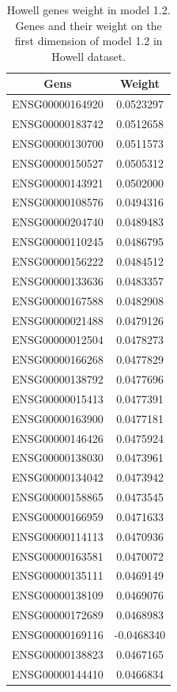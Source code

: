\documentclass[
  12pt,
  a4paper,
  twoside,
  openright]{book}
\begin{document}
\begin{longtable}[t]{cc}
\caption[Howell genes weight in model 1.2]{\label{tab:howell-genes-1-2}Howell genes weight in model 1.2. Genes and their weight on the first dimension of model 1.2 in Howell dataset.}\\
\toprule
Gens & Weight\\
\midrule
ENSG00000164920 & 0.0523297\\
ENSG00000183742 & 0.0512658\\
ENSG00000130700 & 0.0511573\\
ENSG00000150527 & 0.0505312\\
ENSG00000143921 & 0.0502000\\
\addlinespace
ENSG00000108576 & 0.0494316\\
ENSG00000204740 & 0.0489483\\
ENSG00000110245 & 0.0486795\\
ENSG00000156222 & 0.0484512\\
ENSG00000133636 & 0.0483357\\
\addlinespace
ENSG00000167588 & 0.0482908\\
ENSG00000021488 & 0.0479126\\
ENSG00000012504 & 0.0478273\\
ENSG00000166268 & 0.0477829\\
ENSG00000138792 & 0.0477696\\
\addlinespace
ENSG00000015413 & 0.0477391\\
ENSG00000163900 & 0.0477181\\
ENSG00000146426 & 0.0475924\\
ENSG00000138030 & 0.0473961\\
ENSG00000134042 & 0.0473942\\
\addlinespace
ENSG00000158865 & 0.0473545\\
ENSG00000166959 & 0.0471633\\
ENSG00000114113 & 0.0470936\\
ENSG00000163581 & 0.0470072\\
ENSG00000135111 & 0.0469149\\
\addlinespace
ENSG00000138109 & 0.0469076\\
ENSG00000172689 & 0.0468983\\
ENSG00000169116 & -0.0468340\\
ENSG00000138823 & 0.0467165\\
ENSG00000144410 & 0.0466834\\
\bottomrule
\end{longtable}
\end{document}
